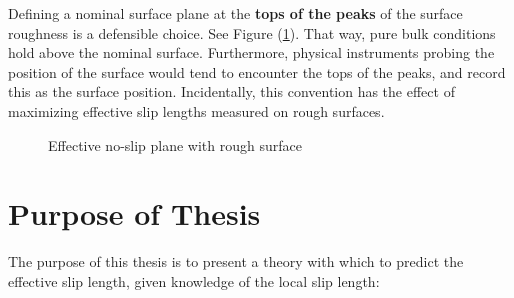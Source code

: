 \documentclass[12pt, a4paper, twoside, openright]{book}
\begin{document}
\clearpage

Defining a nominal surface plane at the \textbf{tops of the peaks} of the surface roughness is a defensible choice.  See Figure (\ref{rougheffnoslip}). That way, pure bulk conditions hold above the nominal surface.
Furthermore, physical instruments probing the position of the surface would tend to encounter the tops of the peaks, and record this as the surface position.
Incidentally, this convention has the effect of maximizing effective slip lengths measured on rough surfaces.  


\begin{figure}[ht!]
\centering
{}
\caption{Effective no-slip plane with rough surface} \label{rougheffnoslip} 
\end{figure}

\clearpage

\section{Purpose of Thesis}

The purpose of this thesis is to present a theory with which to predict the effective slip length, given knowledge of the local slip length:
\end{document}
